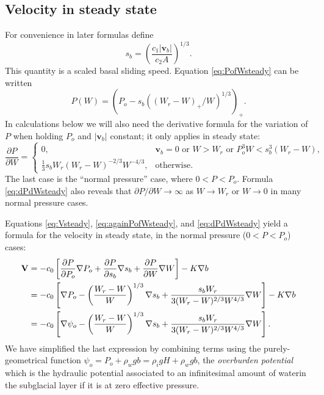 \documentclass[11pt,final]{amsart}%
\newcommand\bv{\mathbf{v}}
\newcommand\bV{\mathbf{V}}
\newcommand{\grad}{\nabla}
\begin{document}
\subsection*{Velocity in steady state}  For convenience in later formulas define
    $$s_b =  \left(\frac{c_1 |\bv_b|}{c_2 A}\right)^{1/3}.$$
This quantity is a scaled basal sliding speed.  Equation \eqref{eq:PofWsteady} can be written
\begin{equation}
P(W) = \left(P_o - s_b \left((W_r - W)_+/W\right)^{1/3}\right)_+.  \label{eq:againPofWsteady}
\end{equation}
In calculations below we will also need the derivative formula for the variation of $P$ when holding $P_o$ and $|\bv_b|$ constant; it only applies in steady state:
\begin{equation}
\frac{\partial P}{\partial W} =
    \begin{cases}
      0, & \bv_b = 0 \text{ or } W > W_r \text{ or } P_o^3 W < s_b^3 (W_r - W), \\
      \frac{1}{3} s_b W_r (W_r - W)^{-2/3} W^{-4/3}, & \text{otherwise}.
    \end{cases}  \label{eq:dPdWsteady}
\end{equation}
The last case is the ``normal pressure'' case, where $0 < P < P_o$.  Formula \eqref{eq:dPdWsteady} also reveals that $\partial P / \partial W \to \infty$ as $W \to W_r$ or $W\to 0$ in many normal pressure cases.

Equations \eqref{eq:Vsteady}, \eqref{eq:againPofWsteady}, and \eqref{eq:dPdWsteady} yield a formula for the velocity in steady state, in the normal pressure ($0 < P < P_o$) cases:
\begin{align}
\bV &= - c_0 \left[\frac{\partial P}{\partial P_o} \grad P_o + \frac{\partial P}{\partial s_b} \grad s_b + \frac{\partial P}{\partial W} \grad W\right] - K \grad b  \notag \\
    &= - c_0 \left[\grad P_o - \left(\frac{W_r - W}{W}\right)^{1/3} \grad s_b + \frac{s_b W_r}{3 (W_r - W)^{2/3} W^{4/3}} \grad W\right] - K \grad b \notag \\
    &= - c_0 \left[\grad \psi_o - \left(\frac{W_r - W}{W}\right)^{1/3} \grad s_b + \frac{s_b W_r}{3 (W_r - W)^{2/3} W^{4/3}} \grad W\right]. \label{eq:Vsteadyexpand}
\end{align}
We have simplified the last expression by combining terms using the purely-geometrical function $\psi_o = P_o + \rho_w g b = \rho_i g H + \rho_w g b$, the \emph{overburden potential} which is the hydraulic potential associated to an infinitesimal amount of waterin the subglacial layer if it is at  zero effective pressure.
\end{document}
